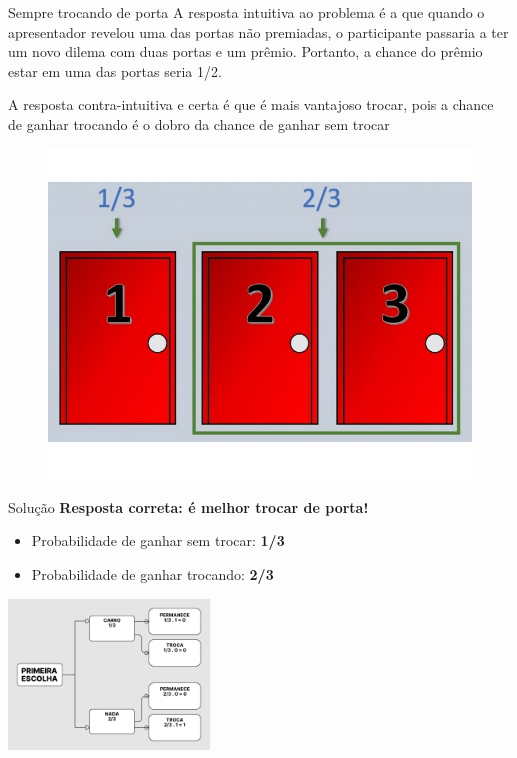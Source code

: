 \begin{frame}[fragile]{Sempre trocando de porta}
A resposta intuitiva ao problema é a que quando o apresentador revelou uma das portas não premiadas, o participante passaria a ter um novo dilema com duas portas e um prêmio. Portanto, a chance do prêmio estar em uma das portas seria 1/2. 
 
A resposta contra-intuitiva e certa é que é mais vantajoso trocar, pois a
chance de ganhar trocando é o dobro da chance de ganhar sem trocar
\begin{figure}
    \centering
    \includegraphics[width=0.45\linewidth]{figures/porc portas.jpg}
    \label{fig:enter-label}
 \end{figure}
\end{frame}

\begin{frame}{Solução}
\textbf{Resposta correta: é melhor trocar de porta!}

\vspace{0.3cm}
\begin{itemize}
  \item Probabilidade de ganhar sem trocar: \textbf{1/3}
  \item Probabilidade de ganhar trocando: \textbf{2/3}
\end{itemize}

\vspace{0.4cm}
\centering
\includegraphics[width=0.4\textwidth]{figures/Grey and White Minimalist Simple Concept Map.png} 
\end{frame}